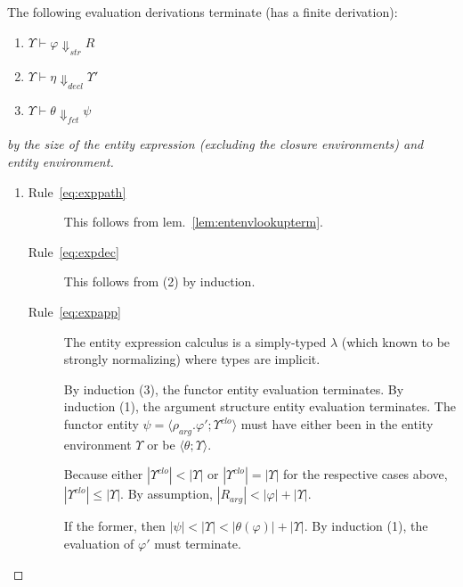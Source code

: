 \begin{lemma}
The following evaluation derivations terminate (has a finite derivation):
\begin{enumerate}
\item $\Upsilon\vdash\varphi\Downarrow_{str}R$
\item $\Upsilon\vdash\eta\Downarrow_{decl}\Upsilon'$
\item $\Upsilon\vdash\theta\Downarrow_{fct} \psi$
\end{enumerate}
\end{lemma}
\begin{proof}[by the size of the entity expression (excluding the closure environments) and entity environment]
\begin{enumerate}
\item \begin{description}
\item[Rule~\ref{eq:exppath}] This follows from lem.~\ref{lem:entenvlookupterm}.
\item[Rule~\ref{eq:expdec}] This follows from (2) by induction.
\item[Rule~\ref{eq:expapp}] The entity expression calculus is a simply-typed $\lambda$ (which known to be strongly normalizing) where types are implicit. 

By induction (3), the functor entity evaluation terminates. By induction (1), the argument structure entity evaluation terminates. The functor entity $\psi=\langle\rho_{arg}.\varphi';\Upsilon^{clo}\rangle$ must have either been in the entity environment $\Upsilon$ or be $\langle \theta;\Upsilon \rangle$.

Because either $|\Upsilon^{clo}| < |\Upsilon|$ or $|\Upsilon^{clo}| = |\Upsilon|$ for the respective cases above, $|\Upsilon^{clo}| \le |\Upsilon|$. By assumption, $|R_{arg}|<|\varphi|+|\Upsilon|$. 
 
If the former, then $|\psi| < |\Upsilon| < |\theta(\varphi)| + |\Upsilon|$. By induction (1), the evaluation of $\varphi'$ must terminate. 


\end{description}
\end{enumerate}
\end{proof}
